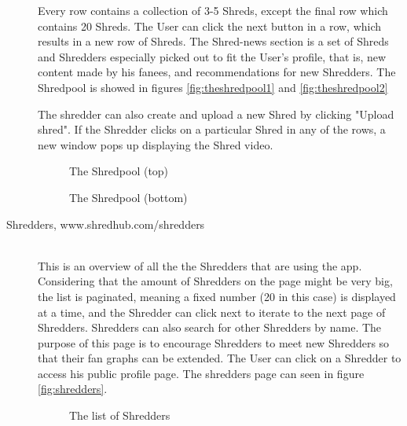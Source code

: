 \begin{description}
Every row contains a collection of 3-5 Shreds, except the final row which contains 20 Shreds. The User can click the next button in a row, which results in a new row of Shreds. The Shred-news section is a set of Shreds and Shredders especially picked out to fit the User's profile, that is, new content made by his fanees, and recommendations for new Shredders. The Shredpool is showed in figures \vref{fig:theshredpool1} and \vref{fig:theshredpool2}

The shredder can also create and upload a new Shred by clicking "Upload shred". If the Shredder clicks on a particular Shred in any of the rows, a new window pops up displaying the Shred video.
		
\begin{figure}
  \begin{center}
\end{center}
\caption{The Shredpool (top)}\label{fig:theshredpool1}
\end{figure}

\begin{figure}
  \begin{center}
\end{center}
\caption{The Shredpool (bottom)}\label{fig:theshredpool2}
\end{figure}

\item [Shredders, www.shredhub.com/shredders] \hfill \\
This is an overview of all the the Shredders that are using the app. Considering that the amount of Shredders on the page might be very big, the list is paginated, meaning a fixed number (20 in this case) is displayed at a time, and the Shredder can click next to iterate to the next page of Shredders. Shredders can also search for other Shredders by name. The purpose of this page is to encourage Shredders to meet new Shredders so that their fan graphs can be extended. The User can click on a Shredder to access his public profile page. The shredders page can seen in figure \vref {fig:shredders}. \begin{figure}
 \begin{center}
\end{center}
\caption{The list of Shredders}\label{fig:shredders}
\end{figure}
		

\end{description}
